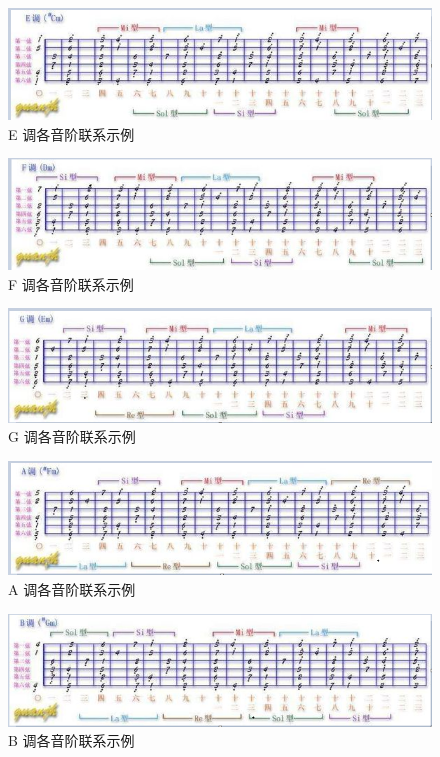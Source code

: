 \documentclass[UTF8,a4paper,12pt]{ctexbook}
\begin{document}
			\begin{figure}[H]
				\centering
				\includegraphics[width=17cm]{E}
				\caption{E 调各音阶联系示例}
			\end{figure}	
						
			\begin{figure}[H]
				\centering
				\includegraphics[width=17cm]{F}
				\caption{F 调各音阶联系示例}
			\end{figure}	

			\begin{figure}[H]
				\centering
				\includegraphics[width=17cm]{G}
				\caption{G 调各音阶联系示例}
			\end{figure}	

			\begin{figure}[H]
				\centering
				\includegraphics[width=17cm]{A}
				\caption{A 调各音阶联系示例}
			\end{figure}	
											
			\begin{figure}[H]
				\centering
				\includegraphics[width=17cm]{B}
				\caption{B 调各音阶联系示例}
			\end{figure}			
		
\end{document}
